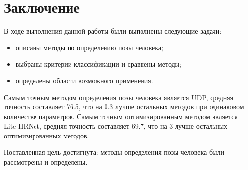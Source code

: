 \chapter*{Заключение}

В ходе выполнения данной работы были выполнены следующие задачи:
\begin{itemize}
	\item описаны методы по определению позы человека;
	\item выбраны критерии классификации и сравнены методы;
	\item определены области возможного применения.
\end{itemize}

Самым точным методом определения позы человека является UDP, средняя точность составляет 76.5, что на 0.3 лучше остальных методов при одинаковом количестве параметров. Самым точным оптимизированным методом является Lite-HRNet, средняя точность составляет 69.7, что на 3 лучше остальных оптимизированных методов.

Поставленная цель достигнута: методы определения позы человека были рассмотрены и определены.